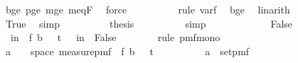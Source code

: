 \begin{isabellebody}
\ b{\isacharunderscore}{\kern0pt}ge{\isacharunderscore}{\kern0pt}{}\ p{\isacharunderscore}{\kern0pt}ge{\isacharunderscore}{\kern0pt}{}\ m{\isacharunderscore}{\kern0pt}ge{\isacharunderscore}{\kern0pt}{}\ m{\isacharunderscore}{\kern0pt}eq{\isacharunderscore}{\kern0pt}F{\isacharunderscore}{\kern0pt}{}\ \isamarkupfalse%
\ force\isanewline
\ \ \ \ \ \ \ \ \isamarkupfalse%
\ {\isacharparenleft}{\kern0pt}rule\ var{\isacharunderscore}{\kern0pt}f{\isacharparenright}{\kern0pt}\ \isamarkupfalse%
\ b{\isacharunderscore}{\kern0pt}ge{\isacharunderscore}{\kern0pt}{}\ \isamarkupfalse%
\ linarith\isanewline
\ \ \ \ \ \ \ \ \isamarkupfalse%
\ True\ \isamarkupfalse%
\ simp\isanewline
\ \ \ \ \ \ \isamarkupfalse%
\ \isamarkupfalse%
\ {\isacharquery}{\kern0pt}thesis\isanewline
\ \ \ \ \ \ \ \ \isamarkupfalse%
\ simp\isanewline
\ \ \ \ \isamarkupfalse%
\isanewline
\ \ \ \ \ \ \isamarkupfalse%
\ False\isanewline
\ \ \ \ \ \ \isamarkupfalse%
\ {\isachardoublequoteopen}{\isasymP}{\isacharparenleft}{\kern0pt}{\isasymomega}\ in\ {\isasymOmega}\ f\ b\ {\isasymomega}\ {\isacharless}{\kern0pt}\ t{\isacharparenright}{\kern0pt}\ {\isasymle}\ {\isasymP}{\isacharparenleft}{\kern0pt}{\isasymomega}\ in\ {\isasymOmega}\ False{\isacharparenright}{\kern0pt}{\isachardoublequoteclose}\isanewline
\ \ \ \ \ \ \isamarkupfalse%
\ {\isacharparenleft}{\kern0pt}rule\ pmf{\isacharunderscore}{\kern0pt}mono{\isacharunderscore}{\kern0pt}{}{\isacharparenright}{\kern0pt}\isanewline
\ \ \ \ \ \ \ \ \isamarkupfalse%
\ {\isasymomega}\isanewline
\ \ \ \ \ \ \ \ \isamarkupfalse%
\ a{\isacharunderscore}{\kern0pt}{}{\isacharcolon}{\kern0pt}{\isachardoublequoteopen}{\isasymomega}\ {\isasymin}\ {\isacharbraceleft}{\kern0pt}{\isasymomega}\ {\isasymin}\ space\ {\isacharparenleft}{\kern0pt}measure{\isacharunderscore}{\kern0pt}pmf\ {\isasymOmega}\ f\ b\ {\isasymomega}\ {\isacharless}{\kern0pt}\ t{\isacharbraceright}{\kern0pt}{\isachardoublequoteclose}\isanewline
\ \ \ \ \ \ \ \ \isamarkupfalse%
\ a{\isacharunderscore}{\kern0pt}{}{\isacharcolon}{\kern0pt}{\isachardoublequoteopen}{\isasymomega}\ {\isasymin}\ set{\isacharunderscore}{\kern0pt}pmf\ {\isasymOmega}\isanewline

\end{isabellebody}
